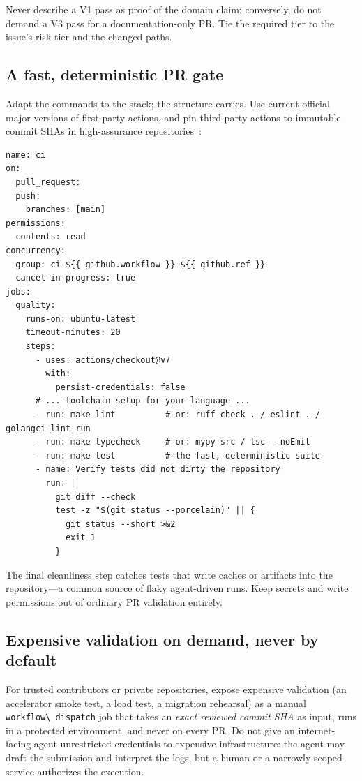 \documentclass[11pt]{article}
\newcommand{\co}[1]{\lstinline[basicstyle=\ttfamily\color{gwInk}]{#1}}
\begin{document}
Never describe a V1 pass as proof of the domain claim; conversely, do not demand a V3 pass for a
documentation-only PR. Tie the required tier to the issue's risk tier and the changed paths.

\subsection{A fast, deterministic PR gate}

Adapt the commands to the stack; the structure carries. Use current official major versions of
first-party actions, and pin third-party actions to immutable commit SHAs in high-assurance
repositories~\cite{github2026secureactions,github2026checkout}:

\begin{lstlisting}[style=gw]
name: ci
on:
  pull_request:
  push:
    branches: [main]
permissions:
  contents: read
concurrency:
  group: ci-${{ github.workflow }}-${{ github.ref }}
  cancel-in-progress: true
jobs:
  quality:
    runs-on: ubuntu-latest
    timeout-minutes: 20
    steps:
      - uses: actions/checkout@v7
        with:
          persist-credentials: false
      # ... toolchain setup for your language ...
      - run: make lint          # or: ruff check . / eslint . / golangci-lint run
      - run: make typecheck     # or: mypy src / tsc --noEmit
      - run: make test          # the fast, deterministic suite
      - name: Verify tests did not dirty the repository
        run: |
          git diff --check
          test -z "$(git status --porcelain)" || {
            git status --short >&2
            exit 1
          }
\end{lstlisting}

The final cleanliness step catches tests that write caches or artifacts into the repository---a
common source of flaky agent-driven runs. Keep secrets and write permissions out of ordinary PR
validation entirely.

\subsection{Expensive validation on demand, never by default}

For trusted contributors or private repositories, expose expensive validation (an accelerator
smoke test, a load test, a migration rehearsal) as a manual \co{workflow\_dispatch} job that
takes an \emph{exact reviewed commit SHA} as input, runs in a protected environment, and never on
every PR. Do not give an internet-facing agent unrestricted credentials to expensive
infrastructure: the agent may draft the submission and interpret the logs, but a human or a
narrowly scoped service authorizes the execution.
\end{document}
